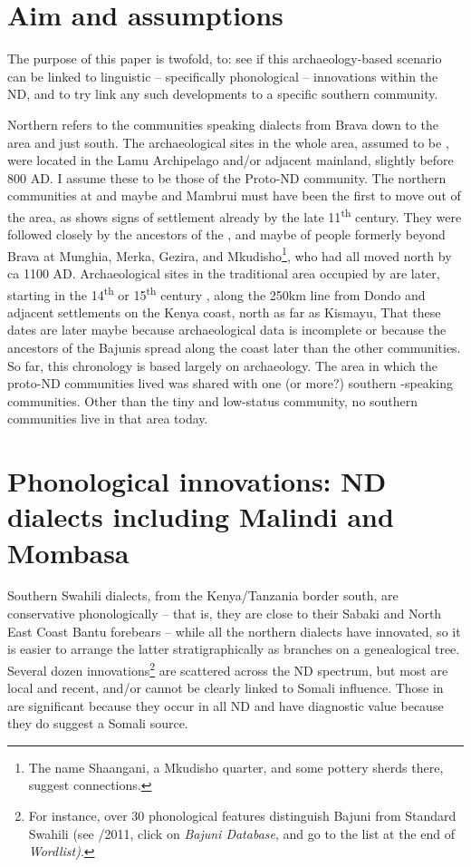 \documentclass[output=paper
,newtxmath
,modfonts
,nonflat]{langsci/langscibook}
\begin{document}
\section{Aim and assumptions}\label{sec:nurse:3} 

The purpose of this paper is twofold, to: see if this archaeology-based scenario can be linked to linguistic -- specifically phonological -- innovations within the ND, and to try link any such developments to a specific southern  community. 

Northern  refers to the communities speaking  dialects from Brava down to the  area and just south. The archaeological sites in the whole area, assumed to be , were located in the Lamu Archipelago and{\slash}or adjacent mainland, slightly before 800 AD. I assume these to be those of the Proto-ND community. The northern communities at  and maybe  and Mambrui must have been the first to move out of the area, as  shows signs of  settlement already by the late 11\textsuperscript{th} century. They were followed closely by the ancestors of the , and maybe of people formerly beyond Brava at Munghia, Merka, Gezira, and Mkudisho\footnote{The name Shaangani, a Mkudisho quarter, and some pottery sherds there, suggest  connections.}, who had all moved north by ca 1100 AD. Archaeological sites in the traditional area occupied by  are later, starting in the 14\textsuperscript{th} or 15\textsuperscript{th} century \citep[91]{Wilson1992}, along the 250km line from Dondo and adjacent settlements on the Kenya coast, north as far as Kismayu, That these dates are later maybe because archaeological data is incomplete or because the ancestors of the Bajunis spread along the coast later than the other communities. So far, this chronology is based largely on archaeology. The area in which the proto-ND communities lived was shared with one (or more?) southern -speaking communities. Other than the tiny and low-status  community, no southern  communities live in that area today. 

\section{Phonological innovations: ND dialects including Malindi and Mombasa}\label{sec:nurse:4} Southern Swahili dialects, from the Kenya/Tanzania border south, are conservative phonologically -- that is, they are close to their Sabaki and North East Coast Bantu forebears -- while all the northern dialects have innovated, so it is easier to arrange the latter stratigraphically as branches on a genealogical tree. Several dozen innovations\footnote{For instance, over 30 phonological features distinguish Bajuni from Standard Swahili (see \citealt{Nurse2013}/2011, click on \textit{Bajuni Database}, and go to the list at the end of \textit{Wordlist)}.}  are scattered across the ND spectrum, but most are local and recent, and/or cannot be clearly linked to Somali influence. Those in  are significant because they occur in all ND and have diagnostic value because they do suggest a Somali source.
\end{document}
